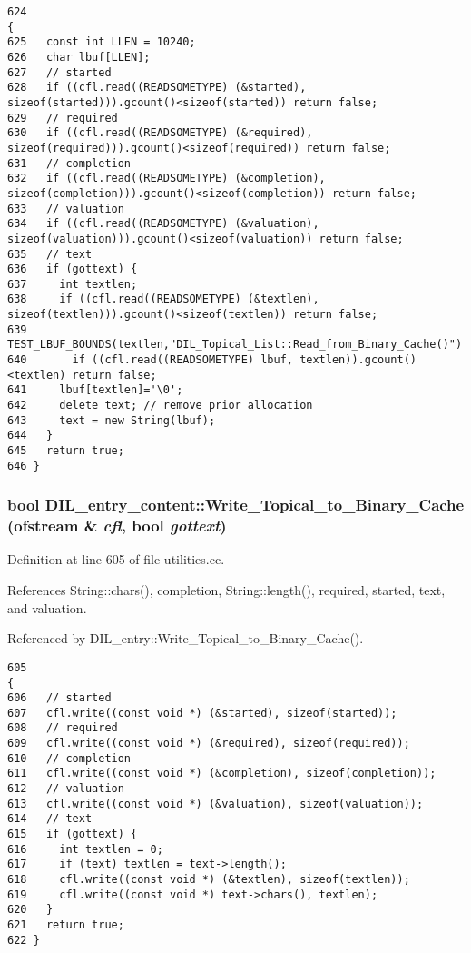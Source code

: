 \footnotesize\begin{verbatim}624                                                                                    {
625   const int LLEN = 10240;
626   char lbuf[LLEN];
627   // started
628   if ((cfl.read((READSOMETYPE) (&started), sizeof(started))).gcount()<sizeof(started)) return false;
629   // required
630   if ((cfl.read((READSOMETYPE) (&required), sizeof(required))).gcount()<sizeof(required)) return false;
631   // completion
632   if ((cfl.read((READSOMETYPE) (&completion), sizeof(completion))).gcount()<sizeof(completion)) return false;
633   // valuation
634   if ((cfl.read((READSOMETYPE) (&valuation), sizeof(valuation))).gcount()<sizeof(valuation)) return false;
635   // text
636   if (gottext) {
637     int textlen;
638     if ((cfl.read((READSOMETYPE) (&textlen), sizeof(textlen))).gcount()<sizeof(textlen)) return false;
639     TEST_LBUF_BOUNDS(textlen,"DIL_Topical_List::Read_from_Binary_Cache()")
640       if ((cfl.read((READSOMETYPE) lbuf, textlen)).gcount()<textlen) return false;
641     lbuf[textlen]='\0';
642     delete text; // remove prior allocation
643     text = new String(lbuf);
644   }
645   return true;
646 }
\end{verbatim}\normalsize 
{}
\subsubsection{\setlength{\rightskip}{0pt plus 5cm}bool DIL\_\-entry\_\-content::Write\_\-Topical\_\-to\_\-Binary\_\-Cache (ofstream \& {\em cfl}, bool {\em gottext})}\label{classDIL__entry__content_a4}




Definition at line 605 of file utilities.cc.

References String::chars(), completion, String::length(), required, started, text, and valuation.

Referenced by DIL\_\-entry::Write\_\-Topical\_\-to\_\-Binary\_\-Cache().



\footnotesize\begin{verbatim}605                                                                                   {
606   // started
607   cfl.write((const void *) (&started), sizeof(started));
608   // required
609   cfl.write((const void *) (&required), sizeof(required));
610   // completion
611   cfl.write((const void *) (&completion), sizeof(completion));
612   // valuation
613   cfl.write((const void *) (&valuation), sizeof(valuation));
614   // text
615   if (gottext) {
616     int textlen = 0;
617     if (text) textlen = text->length();
618     cfl.write((const void *) (&textlen), sizeof(textlen));
619     cfl.write((const void *) text->chars(), textlen);
620   }
621   return true;
622 }
\end{verbatim}\normalsize 


